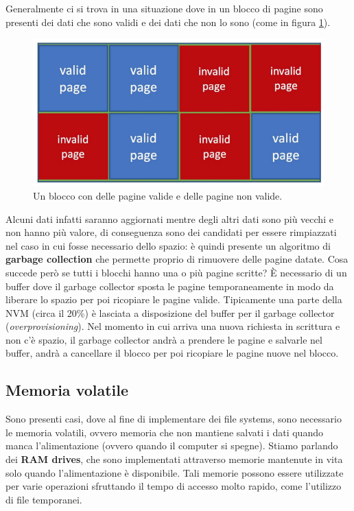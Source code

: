 Generalmente ci si trova in una situazione dove in un blocco di pagine sono presenti dei dati che sono validi e dei dati che non lo sono (come in figura \ref{fig:NAND_block}).
\begin{figure}[h]
    \centering
    \includegraphics[width = .5\textwidth]{../res/imgs/mass memory/NAND_block.png}
    \caption{Un blocco con delle pagine valide e delle pagine non valide.}
    \label{fig:NAND_block}
\end{figure}
Alcuni dati infatti saranno aggiornati mentre degli altri dati sono più vecchi e non hanno più valore, di conseguenza sono dei candidati per essere rimpiazzati nel caso in cui fosse necessario dello spazio: è quindi presente un algoritmo di \textbf{garbage collection} che permette proprio di rimuovere delle pagine datate. Cosa succede però se tutti i blocchi hanno una o più pagine scritte? È necessario di un buffer dove il garbage collector sposta le pagine temporaneamente in modo da liberare lo spazio per poi ricopiare le pagine valide. Tipicamente una parte della NVM (circa il 20\%) è lasciata a disposizione del buffer per il garbage collector (\textit{overprovisioning}). Nel momento in cui arriva una nuova richiesta in scrittura e non c'è spazio, il garbage collector andrà a prendere le pagine e salvarle nel buffer, andrà a cancellare il blocco per poi ricopiare le pagine nuove nel blocco.

% 
\subsection{Memoria volatile}
Sono presenti casi, dove al fine di implementare dei file systems, sono necessario le memoria volatili, ovvero memoria che non mantiene salvati i dati quando manca l'alimentazione (ovvero quando il computer si spegne). Stiamo parlando dei \textbf{RAM drives}, che sono implementati attraverso memorie mantenute in vita solo quando l'alimentazione è disponibile. Tali memorie possono essere utilizzate per varie operazioni sfruttando il tempo di accesso molto rapido, come l'utilizzo di file temporanei.

% 
